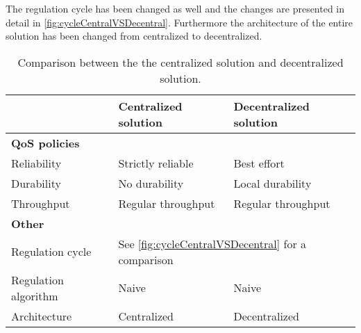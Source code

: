 The regulation cycle has been changed as well and the changes are presented in detail in \cref{fig:cycleCentralVSDecentral}. Furthermore the architecture of the entire solution has been changed from centralized to decentralized.

\begin{table}[!h]
	\begin{tabular}{l l l}
		\hline
		\hline
		~ & \textbf{Centralized solution} & \textbf{Decentralized solution} \\
		\hline
		\hline
		\multicolumn{3}{l}{\textbf{QoS policies}} \\
		\hline
		Reliability & Strictly reliable & Best effort \\
		\hline
		Durability & No durability & Local durability \\
		\hline
		Throughput & Regular throughput & Regular throughput \\
		\hline
		\hline
		\multicolumn{3}{l}{\textbf{Other}} \\
		\hline
		\hline
		Regulation cycle & \multicolumn{2}{l}{See \cref{fig:cycleCentralVSDecentral} for a comparison} \\
		\hline
		Regulation algorithm & Naive & Naive \\
		\hline
		Architecture & Centralized & Decentralized \\
		\hline
		\hline
	\end{tabular}
	
	\caption[Comparison between the the centralized solution and decentralized solution]{
		\label{tab:decentralizedVScentralized}
		\footnotesize{%
			Comparison between the the centralized solution and decentralized solution.
		} 
	}
\end{table}